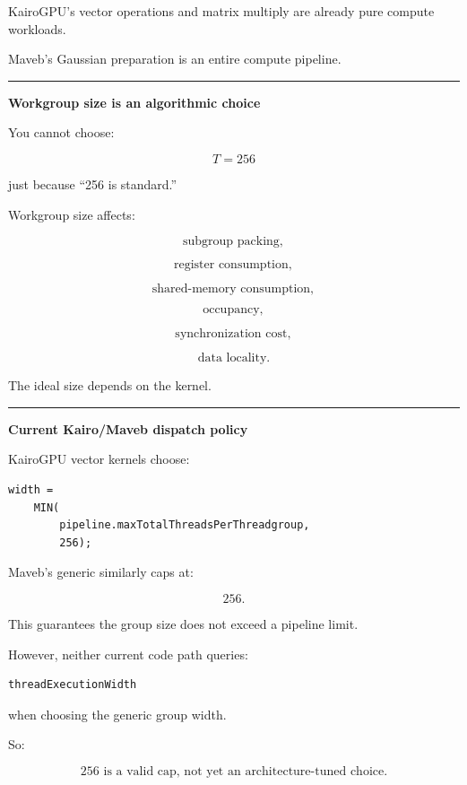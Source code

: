 KairoGPU's vector operations and matrix multiply are already pure compute workloads.

Maveb's Gaussian preparation is an entire compute pipeline.

\begin{center}\rule{0.5\linewidth}{0.5pt}\end{center}

\textbf{Workgroup size is an algorithmic choice}

You cannot choose:

\[
T=256
\]

just because ``256 is standard.''

Workgroup size affects:

\[
\text{subgroup packing},
\]

\[
\text{register consumption},
\]

\[
\text{shared-memory consumption},
\]

\[
\text{occupancy},
\]

\[
\text{synchronization cost},
\]

\[
\text{data locality}.
\]

The ideal size depends on the kernel.

\begin{center}\rule{0.5\linewidth}{0.5pt}\end{center}

\textbf{Current Kairo/Maveb dispatch policy}

KairoGPU vector kernels choose:

\protect{}\label{ozt45h}%
\begin{verbatim}
width =
    MIN(
        pipeline.maxTotalThreadsPerThreadgroup,
        256);
\end{verbatim}

Maveb's generic  similarly caps at:

\[
256.
\]

This guarantees the group size does not exceed a pipeline limit.

However, neither current code path queries:

\protect{}\label{p4wrmn}%
\begin{verbatim}
threadExecutionWidth
\end{verbatim}

when choosing the generic group width.

So:

\[
\boxed{
256\text{ is a valid cap, not yet an architecture-tuned choice}.
}
\]

